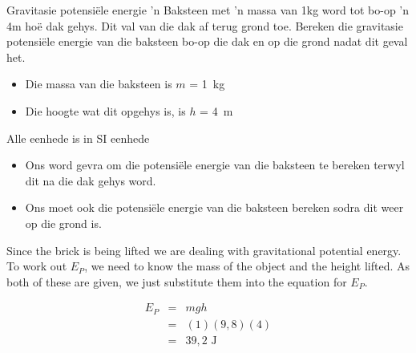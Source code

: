       \noindent
\begin{wex}{Gravitasie potensi\"{e}le energie}{  'n Baksteen met   'n massa van 1kg word tot bo-op   'n 4m ho\"{e} dak gehys. Dit val van die dak af terug grond toe. Bereken die gravitasie potensi\"{e}le energie van die baksteen bo-op die dak en op die grond nadat dit geval het.}
{
\begin{itemize}
\item{Die massa van die baksteen is $m$ = 1~kg}
\item{Die hoogte wat dit opgehys is, is $h$ = 4~m}
\end{itemize}
Alle eenhede is in SI eenhede

\begin{itemize}
\item Ons word gevra om die potensi\"{e}le energie van die baksteen te bereken terwyl dit na die dak gehys word.
\item Ons moet ook die potensi\"{e}le energie van die baksteen bereken sodra dit weer op die grond is.
\end{itemize}

Since the brick is being lifted we are dealing with gravitational potential energy. To work out $E_{P}$, we need to know the mass of the object and the height lifted. As both of these are given, we just substitute them into the equation for $E_{P}$.

\begin{eqnarray*}
E_{P} & = & mgh \\
&=& (1)(9,8)(4) \\
&=& 39,2 \text{ J}
\end{eqnarray*}}
\end{wex}


